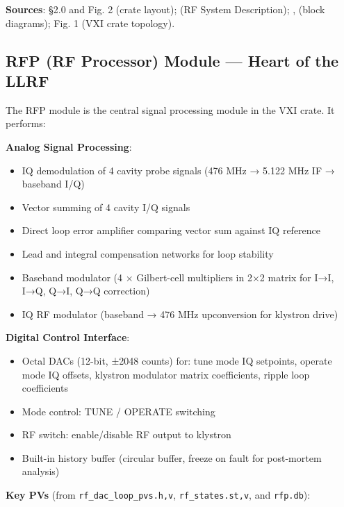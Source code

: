 \begin{keynote}
\textbf{Sources}:  §2.0 and Fig. 2 (crate layout);  (RF System Description); ,  (block diagrams);  Fig. 1 (VXI crate topology).
\end{keynote}

\subsection{RFP (RF Processor) Module --- Heart of the LLRF}

The RFP module is the central signal processing module in the VXI crate. It performs:

\textbf{Analog Signal Processing}:

\begin{itemize}
\tightlist
\item
  IQ demodulation of 4 cavity probe signals (476 MHz → 5.122 MHz IF → baseband I/Q)
\item
  Vector summing of 4 cavity I/Q signals
\item
  Direct loop error amplifier comparing vector sum against IQ reference
\item
  Lead and integral compensation networks for loop stability
\item
  Baseband modulator (4 × Gilbert-cell multipliers in 2×2 matrix for I→I, I→Q, Q→I, Q→Q correction)
\item
  IQ RF modulator (baseband → 476 MHz upconversion for klystron drive)
\end{itemize}

\textbf{Digital Control Interface}:

\begin{itemize}
\tightlist
\item
  Octal DACs (12-bit, ±2048 counts) for: tune mode IQ setpoints, operate mode IQ offsets, klystron modulator matrix coefficients, ripple loop coefficients
\item
  Mode control: TUNE / OPERATE switching
\item
  RF switch: enable/disable RF output to klystron
\item
  Built-in history buffer (circular buffer, freeze on fault for post-mortem analysis)
\end{itemize}

\textbf{Key PVs} (from \texttt{rf\_dac\_loop\_pvs.h,v}, \texttt{rf\_states.st,v}, and \texttt{rfp.db}):

